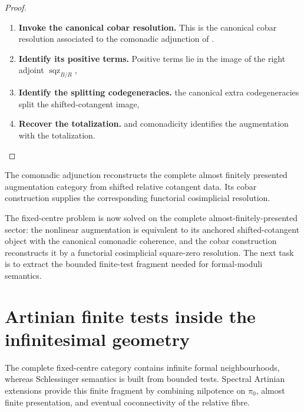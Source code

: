 \begin{proof}
\leavevmode
\begin{enumerate}[label=\textup{(\arabic*)}]
    \item \textbf{Invoke the canonical cobar resolution.}
    This is the canonical cobar resolution associated to the comonadic adjunction
    of .
    \item \textbf{Identify its positive terms.}
    Positive terms lie in the
    image of the right adjoint \(\operatorname{sqz}_{B/R}\),
    \item \textbf{Identify the splitting codegeneracies.}
    the canonical extra
    codegeneracies split the shifted-cotangent image,
    \item \textbf{Recover the totalization.}
    and comonadicity identifies the
    augmentation with the totalization.
\end{enumerate}
\end{proof}

\begin{remark}
\label{rem:formal-augmentations-comonadic-interpretation}
The comonadic adjunction reconstructs the complete almost finitely presented augmentation
category from shifted relative cotangent data. Its cobar construction supplies the
corresponding functorial cosimplicial resolution.
\end{remark}


The fixed-centre problem is now solved on the complete almost-finitely-presented sector:
the nonlinear augmentation is equivalent to its anchored shifted-cotangent object with
the canonical comonadic coherence, and the cobar construction reconstructs it by a
functorial cosimplicial square-zero resolution. The next task is to extract the bounded
finite-test fragment needed for formal-moduli semantics.

\section{Artinian finite tests inside the infinitesimal geometry}
\label{sec:spectral-artinian-extensions}


The complete fixed-centre category contains infinite formal neighbourhoods, whereas
Schlessinger semantics is built from bounded tests. Spectral Artinian extensions provide
this finite fragment by combining nilpotence on \(\pi_0\), almost finite presentation,
and eventual coconnectivity of the relative fibre.

